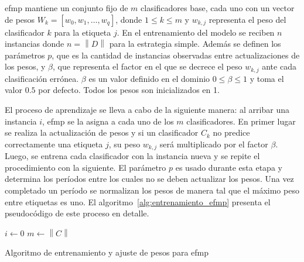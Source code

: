 \acrshort{efmp} mantiene un conjunto fijo de $m$ clasificadores base, cada uno
con un vector de pesos $W_{k} = [w_{0}, w_{1}, \dots, w_{q}]$, donde $1 \leq k
	\leq m$ y $w_{k,j}$ representa el peso del clasificador $k$ para la etiqueta
$j$. En el entrenamiento del modelo se reciben $n$ instancias donde
$n=\left\|D\right\|$ para la estrategia simple. Además se definen los parámetros
$p$, que es la cantidad de instancias observadas entre actualizaciones de los
pesos, y $\beta$, que representa el factor en el que se decrece el peso
$w_{k,j}$ ante cada clasificación errónea. $\beta$ es un valor definido en el
dominio $0 \leq \beta \leq 1$ y toma el valor $0.5$ por defecto. Todos los pesos
son inicializados en 1.

El proceso de aprendizaje se lleva a cabo de la siguiente manera: al arribar una
instancia $i$, \acrshort{efmp} se la asigna a cada uno de los $m$
clasificadores. En primer lugar se realiza la actualización de pesos y si un
clasificador $C_{k}$ no predice correctamente una etiqueta $j$, su peso
$w_{k,j}$ será multiplicado por el factor $\beta$. Luego, se entrena cada
clasificador con la instancia nueva y se repite el procedimiento con la
siguiente. El parámetro $p$ es usado durante esta etapa y determina los períodos
entre los cuales no se deben actualizar los pesos. Una vez completado un período
se normalizan los pesos de manera tal que el máximo peso entre etiquetas es uno.
El algoritmo~\ref{alg:entrenamiento_efmp} presenta el pseudocódigo de este
proceso en detalle.

\begin{center}
	\begin{algorithm}[H]
		\label{alg:entrenamiento_efmp}
		\SetAlgoLined
		\DontPrintSemicolon
		$i \gets 0$ \;
		$m \gets \left\|C\right\|$ \;
		\caption{Algoritmo de entrenamiento y ajuste de pesos para \acrfull{efmp}}
	\end{algorithm}
\end{center}

